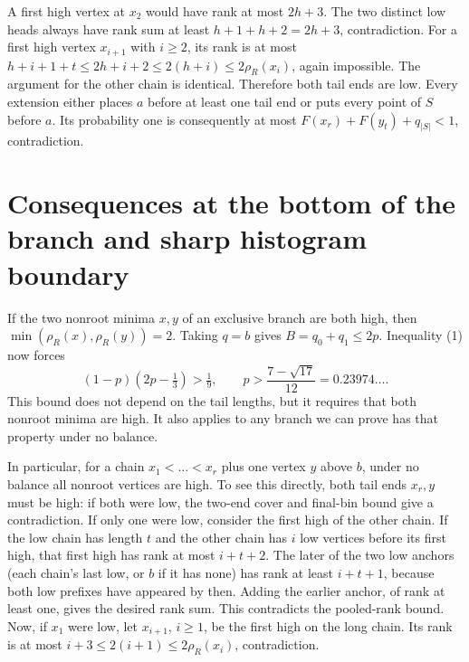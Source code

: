 \documentclass[11pt,letterpaper]{article}
\begin{document}
A first high vertex at \(x_2\) would have rank at most \(2h+3\). The two
distinct low heads always have rank sum at least \(h+1+h+2=2h+3\),
contradiction. For a first high vertex \(x_{i+1}\) with \(i\ge2\), its
rank is at most \(h+i+1+t\le2h+i+2\le2(h+i)\le2\rho_R(x_i)\), again
impossible. The argument for the other chain is identical. Therefore
both tail ends are low. Every extension either places \(a\) before at
least one tail end or puts every point of \(S\) before \(a\). Its
probability one is consequently at most \(F(x_r)+F(y_t)+q_{|S|}<1\),
contradiction.

\section{Consequences at the bottom of the branch and sharp histogram
boundary}\label{consequences-at-the-bottom-of-the-branch-and-sharp-histogram-boundary}

If the two nonroot minima \(x,y\) of an exclusive branch are both high,
then \(\min(\rho_R(x),\rho_R(y))=2\). Taking \(q=b\) gives
\(B=q_0+q_1\le2p\). Inequality (1) now forces \[
   (1-p)(2p-\tfrac13)>\tfrac19,
   \qquad p>\frac{7-\sqrt {17}}{12}=0.23974\ldots.  \tag{3}
\] This bound does not depend on the tail lengths, but it requires that
both nonroot minima are high. It also applies to any branch we can prove
has that property under no balance.

In particular, for a chain \(x_1<\dots<x_r\) plus one vertex \(y\) above
\(b\), under no balance all nonroot vertices are high. To see this
directly, both tail ends \(x_r,y\) must be high: if both were low, the
two-end cover and final-bin bound give a contradiction. If only one were
low, consider the first high of the other chain. If the low chain has
length \(t\) and the other chain has \(i\) low vertices before its first
high, that first high has rank at most \(i+t+2\). The later of the two
low anchors (each chain's last low, or \(b\) if it has none) has rank at
least \(i+t+1\), because both low prefixes have appeared by then. Adding
the earlier anchor, of rank at least one, gives the desired rank sum.
This contradicts the pooled-rank bound. Now, if \(x_1\) were low, let
\(x_{i+1}\), \(i\ge1\), be the first high on the long chain. Its rank is
at most \(i+3\le2(i+1)\le2\rho_R(x_i)\), contradiction.
\end{document}
